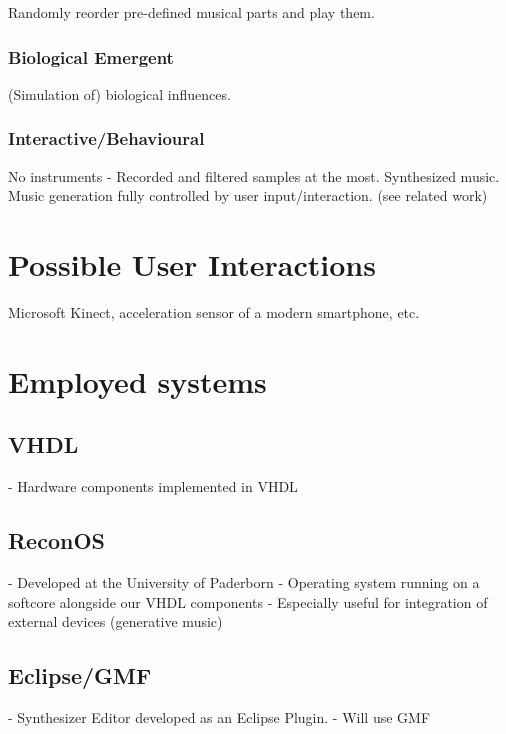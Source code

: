 	Randomly reorder pre-defined musical parts and play them.

	\subsubsection{Biological Emergent}

	(Simulation of) biological influences.

	\subsubsection{Interactive/Behavioural}

	No instruments - Recorded and filtered samples at the most. Synthesized music. Music generation fully controlled by user input/interaction. (see related work)

	\section{Possible User Interactions}
	Microsoft Kinect, acceleration sensor of a modern smartphone, etc.
	  
	\section{Employed systems}
	  \subsection{VHDL}
	    - Hardware components implemented in VHDL
	  \subsection{ReconOS}
	    - Developed at the University of Paderborn
	    - Operating system running on a softcore alongside our VHDL components
	    - Especially useful for integration of external devices (generative music)
	  \subsection{Eclipse/GMF}
	    - Synthesizer Editor developed as an Eclipse Plugin.
	    - Will use GMF

	  
      